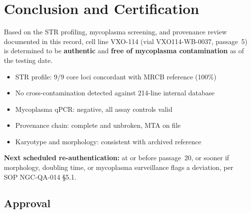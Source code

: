 
\section{Conclusion and Certification}

Based on the STR profiling, mycoplasma screening, and provenance review documented in this
record, cell line VXO-114 (vial VXO114-WB-0037, passage~5) is determined to be
\textbf{authentic} and \textbf{free of mycoplasma contamination} as of the testing date.

\begin{center}
\begin{minipage}{0.9\textwidth}
  \begin{tcolorbox}[colback=labpale, colframe=labnavy, arc=2pt, boxrule=0.8pt]
    \begin{itemize}[leftmargin=1.4em, itemsep=2pt]
      \item[\faCheckCircle] STR profile: 9/9 core loci concordant with MRCB reference (100\%)
      \item[\faCheckCircle] No cross-contamination detected against 214-line internal database
      \item[\faCheckCircle] Mycoplasma qPCR: negative, all assay controls valid
      \item[\faCheckCircle] Provenance chain: complete and unbroken, MTA on file
      \item[\faCheckCircle] Karyotype and morphology: consistent with archived reference
    \end{itemize}
  \end{tcolorbox}
\end{minipage}
\end{center}

\textbf{Next scheduled re-authentication:} at or before passage~20, or sooner if morphology,
doubling time, or mycoplasma surveillance flags a deviation, per SOP NGC-QA-014 \S 5.1.

\subsection{Approval}


